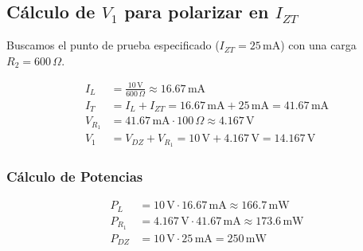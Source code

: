 \documentclass[journal]{IEEEtran}
\begin{document}
\subsection{Cálculo de $V_1$ para polarizar en $I_{ZT}$}

Buscamos el punto de prueba especificado ($I_{ZT} = 25\,\text{mA}$) con una carga 
$R_2 = 600\,\Omega$.

\begin{align*}
I_L &= \frac{10\,\text{V}}{600\,\Omega} \approx 16.67\,\text{mA} \\
I_T &= I_L + I_{ZT} = 16.67\,\text{mA} + 25\,\text{mA} = 41.67\,\text{mA} \\
V_{R_1} &= 41.67\,\text{mA} \cdot 100\,\Omega \approx 4.167\,\text{V} \\
V_1 &= V_{DZ} + V_{R_1} 
= 10\,\text{V} + 4.167\,\text{V} = 14.167\,\text{V}
\end{align*}

\subsubsection{Cálculo de Potencias}

\begin{align*}
P_L &= 10\,\text{V} \cdot 16.67\,\text{mA} \approx 166.7\,\text{mW} \\
P_{R_1} &= 4.167\,\text{V} \cdot 41.67\,\text{mA} \approx 173.6\,\text{mW} \\
P_{DZ} &= 10\,\text{V} \cdot 25\,\text{mA} = 250\,\text{mW}
\end{align*}
\end{document}
